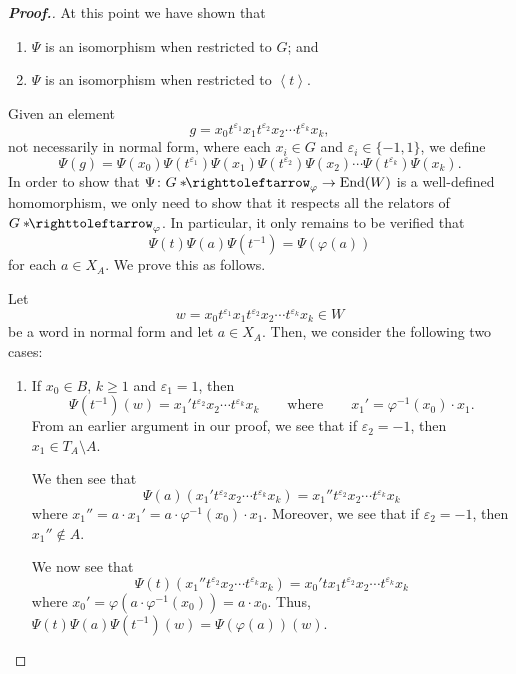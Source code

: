 \documentclass[11pt,a4paper,reqno]{amsart}
\theoremstyle{plain}
\theoremstyle{definition}
\theoremstyle{definition}
\renewcommand\geq\geqslant
\newenvironment{myproof}{\begin{proof}[\normalfont\bfseries Proof.]}{\end{proof}}
\newcommand\hnn{*\!\!\righttoleftarrow}
\begin{document}
\begin{myproof}
	\smallskip
	\noindent
	At this point we have shown that
	\begin{enumerate}[label=\alph*)]
		\item $\Psi$ is an isomorphism when restricted to $G$; and
		\item $\Psi$ is an isomorphism when restricted to $\left\langle t \right\rangle$.
	\end{enumerate}
	Given an element
	\[
		g  = x_0 t^{\varepsilon_1} x_1 t^{\varepsilon_2} x_2 \cdots t^{\varepsilon_k} x_k,
	\]
	not necessarily in normal form, where each $x_i \in G$ and $\varepsilon_i\in \{-1,1\}$, we define
	\[
		\Psi(g)
		=
		\Psi(x_0) \Psi(t^{\varepsilon_1})\Psi(x_1)
		\Psi(t^{\varepsilon_2})\Psi(x_2)
		\cdots
		\Psi(t^{\varepsilon_k})\Psi(x_k).
	\]
	In order to show that $\Psi\colon G\hnn_\varphi\to \mathrm{End}(W)$ is a well-defined homomorphism, we only need to show that it respects all the relators of $G\hnn_\varphi$. In particular, it only remains to be verified that
	\[
		\Psi(t)\Psi(a)\Psi(t^{-1}) = \Psi(\varphi(a))
	\]
	for each $a\in X_A$.
	We prove this as follows.

	Let
	\[
		w = x_0 t^{\varepsilon_1} x_1 t^{\varepsilon_2} x_2 \cdots t^{\varepsilon_k} x_k \in W
	\]
	be a word in normal form and let $a\in X_A$.
	Then, we consider the following two cases:
	\begin{enumerate}[label=\alph*)]
		\item If $x_0 \in B$, $k\geq 1$ and $\varepsilon_1 = 1$, then
		      \[
			      \Psi(t^{-1})(w)
			      =
			      x_1' t^{\varepsilon_2} x_2 \cdots t^{\varepsilon_k} x_k
			      \qquad
			      \text{where}
			      \qquad
			      x_1' = \varphi^{-1}(x_0) \cdot x_1.
		      \]
		      From an earlier argument in our proof, we see that if $\varepsilon_2 = -1$, then $x_1 \in T_A\setminus A$.

		      We then see that
		      \[
			      \Psi(a)(x_1' t^{\varepsilon_2} x_2 \cdots t^{\varepsilon_k} x_k)
			      =
			      x_1'' t^{\varepsilon_2} x_2 \cdots t^{\varepsilon_k} x_k
		      \]
		      where $x_1'' = a\cdot x_1' = a\cdot \varphi^{-1}(x_0) \cdot x_1$.
		      Moreover, we see that if $\varepsilon_2 = -1$, then $x_1'' \notin A$.

		      We now see that
		      \[
			      \Psi(t)(x_1'' t^{\varepsilon_2} x_2 \cdots t^{\varepsilon_k} x_k)
			      =
			      x_0' t x_1 t^{\varepsilon_2} x_2 \cdots t^{\varepsilon_k} x_k
		      \]
		      where $x_0' = \varphi(a \cdot \varphi^{-1}(x_0)) = a\cdot x_0$.
		      Thus, $\Psi(t)\Psi(a)\Psi(t^{-1}) (w) = \Psi(\varphi(a))(w)$.


\end{enumerate}
\end{myproof}
\end{document}
